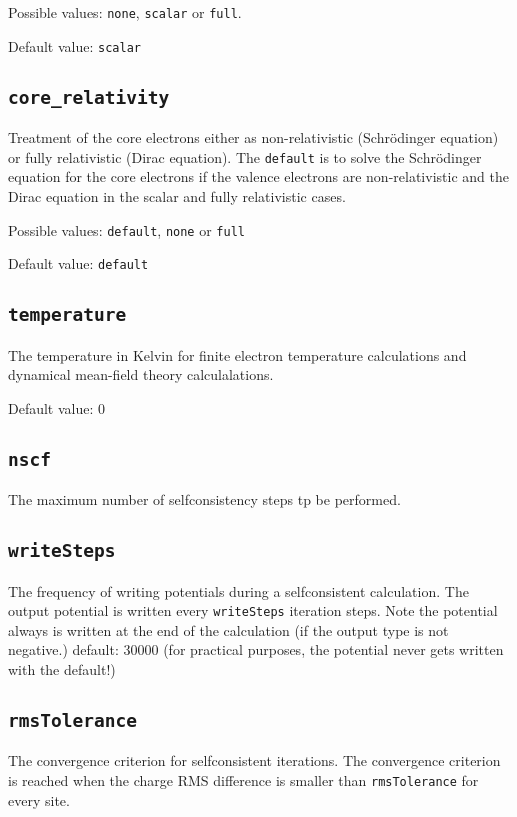 Possible values: \texttt{none}, \texttt{scalar} or \texttt{full}.

Default value: \texttt{scalar} 

\subsection{\texttt{core\_relativity}}
Treatment of the core electrons either as non-relativistic (Schr\"odinger equation)
or fully relativistic (Dirac equation).
The \texttt{default} is to solve the Schr\"odinger equation for the core electrons if the valence
electrons are non-relativistic and the Dirac equation in the scalar and fully relativistic cases.
 
Possible values: \texttt{default}, \texttt{none} or \texttt{full}

Default value: \texttt{default}

\subsection{\texttt{temperature}}
The temperature in Kelvin for finite electron temperature
calculations and dynamical mean-field theory calculalations.

Default value: 0

\subsection{\texttt{nscf}}
The maximum number of selfconsistency steps tp be performed.

\subsection{\texttt{writeSteps}}
The frequency of writing potentials during a selfconsistent
calculation. The output potential is written every \texttt{writeSteps}
iteration steps. Note the potential always is written at the end of
the calculation (if the output type is not negative.)
default: 30000 (for practical purposes, the potential never gets
written with the default!)

\subsection{\texttt{rmsTolerance}}
The convergence criterion for selfconsistent iterations. The convergence criterion is reached when
the charge RMS difference is smaller than \texttt{rmsTolerance} for every site.

